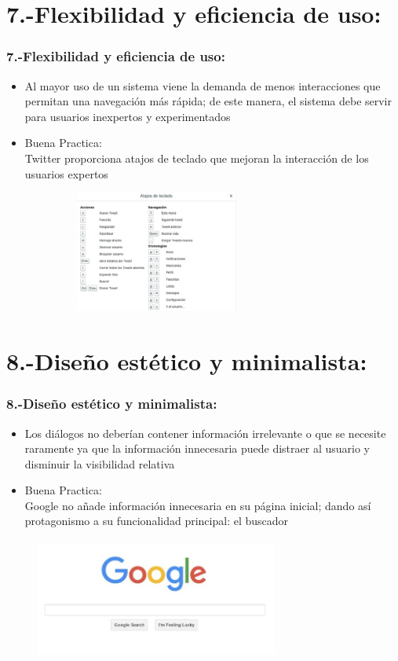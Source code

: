 \documentclass[11pt]{beamer}
\begin{document}
\section{7.-Flexibilidad y eficiencia de uso:}
\begin{frame}
\frametitle{7.-Flexibilidad y eficiencia de uso:}

\begin{itemize}
\item Al mayor uso de un sistema viene la demanda de menos interacciones que permitan una navegación más rápida; de este manera, el sistema debe servir para usuarios inexpertos y experimentados
\item Buena Practica:\\ Twitter proporciona atajos de teclado que mejoran la interacción de los usuarios expertos
\end{itemize}

\begin{figure}
  \centering
  \includegraphics[width=8.0cm,height=4.0cm]{img/Imagen7.png}
\end{figure}
\end{frame}

\section{8.-Diseño estético y minimalista:}
\begin{frame}
\frametitle{8.-Diseño estético y minimalista:}

\begin{itemize}
\item Los diálogos no deberían contener información irrelevante o que se necesite raramente ya que la información innecesaria puede distraer al usuario y disminuir la visibilidad relativa
\item Buena Practica:\\ Google no añade información innecesaria en su página inicial; dando así protagonismo a su funcionalidad principal: el buscador
\end{itemize}

\begin{figure}
  \centering
  \includegraphics[width=8.0cm,height=4.0cm]{img/Imagen8.jpg}
\end{figure}
\end{frame}
\end{document}
